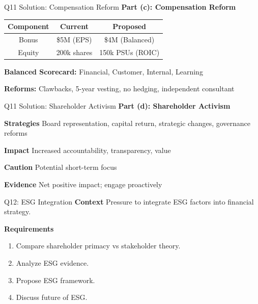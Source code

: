 \documentclass[aspectratio=169,10pt]{beamer}
\renewcommand{\small}{\fontsize{6pt}{7.5pt}\selectfont}
\renewcommand{\large}{\fontsize{8pt}{10pt}\selectfont}
\newcommand{\question}[1]{{\large\bfseries\color{crimson}#1}}
\begin{document}
	\begin{frame}{Q11 Solution: Compensation Reform}
		\question{Part (c): Compensation Reform}
		\small
		\begin{table}[h]
			\centering
			\begin{tabular}{|c|c|c|}
				\hline
				\textbf{Component} & \textbf{Current} & \textbf{Proposed} \\
				\hline
				Bonus & \$5M (EPS) & \$4M (Balanced) \\
				Equity & 200k shares & 150k PSUs (ROIC) \\
				\hline
			\end{tabular}
		\end{table}
		
		\vspace{0.1cm}
		\textbf{Balanced Scorecard:}
		Financial, Customer, Internal, Learning
		
		\vspace{0.1cm}
		\textbf{Reforms:}
		Clawbacks, 5-year vesting, no hedging, independent consultant
	\end{frame}
	
	\begin{frame}{Q11 Solution: Shareholder Activism}
		\question{Part (d): Shareholder Activism}
		\small
		
		\textbf{Strategies}
		Board representation, capital return, strategic changes, governance reforms
		
		\vspace{0.1cm}
		\textbf{Impact}
		Increased accountability, transparency, value
		
		\vspace{0.1cm}
		\textbf{Caution}
		Potential short-term focus
		
		\vspace{0.1cm}
		\textbf{Evidence}
		Net positive impact; engage proactively
	\end{frame}
	
	\begin{frame}{Q12: ESG Integration}
		\question{Context}
		\small
		Pressure to integrate ESG factors into financial strategy.
		
		\vspace{0.1cm}
		\question{Requirements}
		\begin{enumerate}
			\item Compare shareholder primacy vs stakeholder theory.
			\item Analyze ESG evidence.
			\item Propose ESG framework.
			\item Discuss future of ESG.
		\end{enumerate}
	\end{frame}
	
\end{document}
